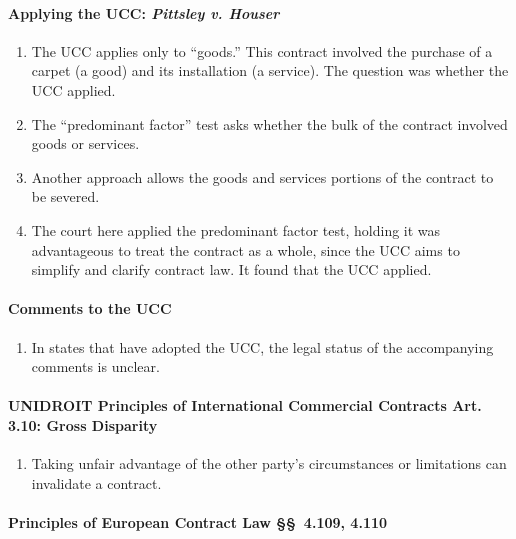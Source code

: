 \paragraph{Applying the UCC: \emph{Pittsley v. Houser}}

\begin{enumerate}
    \item The UCC applies only to ``goods.'' This contract involved the 
    purchase of a carpet (a good) and its installation (a service). The 
    question was whether the UCC applied.
    \item The ``predominant factor'' test asks whether the bulk of the 
    contract involved goods or services.
    \item Another approach allows the goods and services portions of the 
    contract to be severed.
    \item The court here applied the predominant factor test, holding it was 
    advantageous to treat the contract as a whole, since the UCC aims to 
    simplify and clarify contract law. It found that the UCC applied.
\end{enumerate}

\paragraph{Comments to the UCC}

\begin{enumerate}
    \item In states that have adopted the UCC, the legal status of the 
    accompanying comments is unclear.
\end{enumerate}

\paragraph{UNIDROIT Principles of International Commercial Contracts Art. 
3.10: Gross Disparity}

\begin{enumerate}
    \item Taking unfair advantage of the other party's circumstances or 
    limitations can invalidate a contract.
\end{enumerate}

\paragraph{Principles of European Contract Law \S\S\ 4.109, 4.110}

